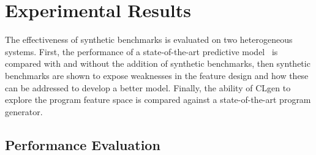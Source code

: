 \section{Experimental Results}
\label{sec:clgen-eval-results}

The effectiveness of synthetic benchmarks is evaluated on two heterogeneous systems. First, the performance of a state-of-the-art predictive model~\cite{Grewe2013} is compared with and without the addition of synthetic benchmarks, then synthetic benchmarks are shown to expose weaknesses in the feature design and how these can be addressed to develop a better model. Finally, the ability of CLgen to explore the program feature space is compared against a state-of-the-art program generator.

\subsection{Performance Evaluation}


